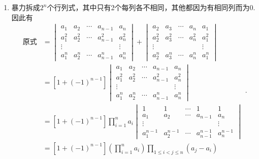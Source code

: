 \begin{enumerate}
    \item 暴力拆成$2^n$个行列式，其中只有2个每列各不相同，其他都因为有相同列而为0. 因此有\[
    \begin{aligned}
    \text{原式}&=\begin{vmatrix}
    a_{1} & a_{2} & \cdots & a_{n-1} & a_{n} \\
    a_{1}^{2}& a_{2}^{2} & \cdots & a_{n-1}^{2} & a_{n}^{2} \\
    \vdots & & & & \vdots \\
    a_{1}^{n} & a_{2}^{n} & \cdots & a_{n-1}^{n} & a_{n}^{n}
    \end{vmatrix}+
    \begin{vmatrix}
    a_{2} & a_{3} & \cdots & a_{n} & a_{1} \\
    a_{2}^{2} & a_{3}^{2} & \cdots & a_{n}^{2} & a_{1}^{2} \\
    \vdots & & & & \vdots \\
    a_{2}^{n} & a_{3}^{n} & \cdots & a_{n}^{n} & a_{1}^{n}
    \end{vmatrix}\\
    &=[1+(-1)^{n-1}]\begin{vmatrix}
    a_{1} & a_{2} & \cdots & a_{n-1} & a_{n} \\
    a_{1}^{2}& a_{2}^{2} & \cdots & a_{n-1}^{2} & a_{n}^{2} \\
    \vdots & & & & \vdots \\
    a_{1}^{n} & a_{2}^{n} & \cdots & a_{n-1}^{n} & a_{n}^{n}
    \end{vmatrix}\\&=[1+(-1)^{n-1}]\prod_{i=1}^na_i
    \begin{vmatrix}
    1 & 1 & \cdots & 1 & 1 \\
    a_{1}& a_{2} & \cdots & a_{n-1} & a_{n} \\
    \vdots & & & & \vdots \\
    a_{1}^{n-1} & a_{2}^{n-1} & \cdots & a_{n-1}^{n-1} & a_{n}^{n-1}
    \end{vmatrix}\\
    &=[1+(-1)^{n-1}]\left(\prod_{i=1}^na_i\right)\prod_{1\leqslant i<j\leqslant n}(a_j-a_i)\\
    \end{aligned}.\]


\end{enumerate}
